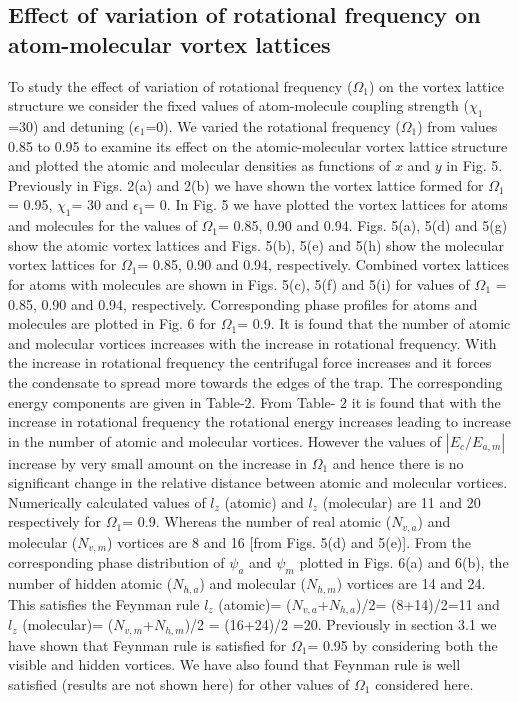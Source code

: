\documentclass[10pt,a4paper]{article}
\begin{document}
\subsection{Effect of variation of rotational frequency on atom-molecular vortex lattices}

To study the effect of variation of rotational frequency
($\Omega_1$) on the vortex lattice structure we consider the fixed
values of atom-molecule coupling strength ($\chi_1$ =30) and
detuning ($\epsilon_1$=0). We varied the rotational frequency
($\Omega_1$) from values 0.85 to 0.95 to examine its effect on the
atomic-molecular vortex lattice structure and plotted the atomic
and molecular densities as functions of $x$ and $y$ in Fig. 5.
Previously in Figs. 2(a) and 2(b) we have shown the vortex lattice
formed for $\Omega_1$= 0.95, $\chi_1$= 30 and $\epsilon_1$= 0. In
Fig. 5 we have plotted the vortex lattices for atoms and molecules
for the values of $\Omega_1$= 0.85, 0.90 and 0.94. Figs. 5(a), 5(d)
and 5(g) show the atomic vortex lattices and Figs. 5(b), 5(e) and
5(h) show the molecular vortex lattices for $\Omega_1$= 0.85, 0.90
and 0.94, respectively. Combined vortex lattices for atoms with
molecules are shown in Figs. 5(c), 5(f) and 5(i) for values of
$\Omega_1$ = 0.85, 0.90 and 0.94, respectively. Corresponding phase
profiles for atoms and molecules are plotted in Fig. 6 for $\Omega_1$= 0.9. 
It is found that the number of
atomic and molecular vortices increases with the increase in
rotational frequency. With the increase in rotational frequency the
centrifugal force increases and it forces the condensate to spread
more towards the edges of the trap. The corresponding energy
components are given in Table-2. From Table- 2 it is found that
with the increase in rotational frequency the rotational energy
increases leading to increase in the number of atomic and
molecular vortices. However the values of $|E_c/E_{a,m}|$ increase
by very small amount on the increase in $\Omega_1$ and hence there
is no significant change in the relative distance between atomic
and molecular vortices. Numerically calculated values of $l_z$
(atomic) and  $l_z$ (molecular) are 11 and 20 respectively for
$\Omega_1$= 0.9. Whereas the number of real atomic ($N_{v,a}$) and
molecular ($N_{v,m}$) vortices are 8 and 16 [from Figs. 5(d) and
5(e)]. From the corresponding phase distribution of $\psi_a$ and $\psi_m$ plotted in Figs.
6(a) and 6(b), the number of hidden atomic ($N_{h,a}$) and
molecular ($N_{h,m}$) vortices are 14 and 24. This satisfies the
Feynman rule $l_z$ (atomic)= ($N_{v,a}$+$N_{h,a}$)/2= (8+14)/2=11
and $l_z$ (molecular)= ($N_{v,m}$+$N_{h,m}$)/2 = (16+24)/2 =20.  
Previously in section 3.1 we have shown that Feynman rule is satisfied for 
$\Omega_1$= 0.95 by considering both the visible and hidden vortices. We have also found 
that Feynman rule is well satisfied (results are not shown here) for other values of 
$\Omega_1$ considered here.
\end{document}
